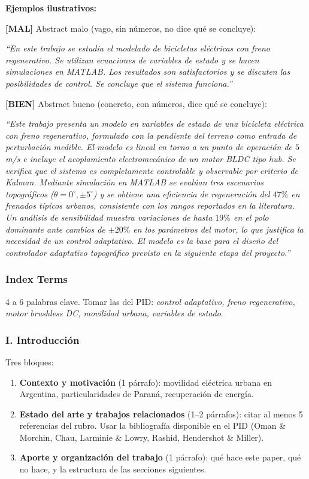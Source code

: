 \documentclass[11pt,a4paper]{article}
\newcommand{\malo}{\textcolor{red!70!black}{\textbf{[MAL]}}}
\newcommand{\bueno}{\textcolor{green!50!black}{\textbf{[BIEN]}}}
\begin{document}
\begin{ejemplo}
\textbf{Ejemplos ilustrativos:}

\malo{} Abstract malo (vago, sin números, no dice qué se concluye):

\textit{``En este trabajo se estudia el modelado de bicicletas eléctricas con freno regenerativo. Se utilizan ecuaciones de variables de estado y se hacen simulaciones en MATLAB. Los resultados son satisfactorios y se discuten las posibilidades de control. Se concluye que el sistema funciona.''}

\bueno{} Abstract bueno (concreto, con números, dice qué se concluye):

\textit{``Este trabajo presenta un modelo en variables de estado de una bicicleta eléctrica con freno regenerativo, formulado con la pendiente del terreno como entrada de perturbación medible. El modelo es lineal en torno a un punto de operación de $5\,$m/s e incluye el acoplamiento electromecánico de un motor BLDC tipo hub. Se verifica que el sistema es completamente controlable y observable por criterio de Kalman. Mediante simulación en MATLAB se evalúan tres escenarios topográficos ($\theta = 0^\circ, \pm 5^\circ$) y se obtiene una eficiencia de regeneración del $47\%$ en frenados típicos urbanos, consistente con los rangos reportados en la literatura. Un análisis de sensibilidad muestra variaciones de hasta $19\%$ en el polo dominante ante cambios de $\pm 20\%$ en los parámetros del motor, lo que justifica la necesidad de un control adaptativo. El modelo es la base para el diseño del controlador adaptativo topográfico previsto en la siguiente etapa del proyecto.''}
\end{ejemplo}

\subsubsection{Index Terms}

4 a 6 palabras clave. Tomar las del PID: \textit{control adaptativo, freno regenerativo, motor brushless DC, movilidad urbana, variables de estado}.

\subsubsection{I. Introducción}

Tres bloques:

\begin{enumerate}
    \item \textbf{Contexto y motivación} (1 párrafo): movilidad eléctrica urbana en Argentina, particularidades de Paraná, recuperación de energía.
    \item \textbf{Estado del arte y trabajos relacionados} (1--2 párrafos): citar al menos 5 referencias del rubro. Usar la bibliografía disponible en el PID (Oman \& Morchin, Chau, Larminie \& Lowry, Rashid, Hendershot \& Miller).
    \item \textbf{Aporte y organización del trabajo} (1 párrafo): qué hace este paper, qué no hace, y la estructura de las secciones siguientes.
\end{enumerate}
\end{document}
